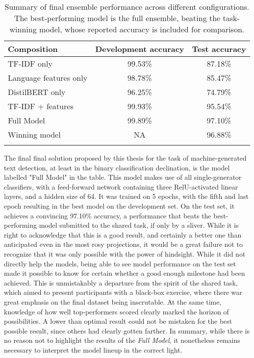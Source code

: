 \begin{table}[ht]
    \vspace{0.1cm}
    \centering
    \begin{tabular}{lcc}
        \toprule
        Composition            & Development accuracy & Test accuracy \\

        \midrule
        TF-IDF only            & 99.53\%              & 87.18\%       \\
        Language features only & 98.78\%              & 85.47\%       \\
        DistilBERT only        & 96.25\%              & 74.79\%       \\
        TF-IDF + features      & 99.93\%              & 95.54\%       \\
        \midrule
        Full Model             & 99.89\%              & 97.10\%       \\
        Winning model          & NA                   & 96.88\%       \\
        \bottomrule
        \vspace{0.1cm}
    \end{tabular}
    \caption{
        Summary of final ensemble performance across different configurations.
        The best-performing model is the full ensemble, beating the task-winning model, whose reported accuracy is included for comparison.
    }
    \label{tab:ensemble-final}
\end{table}

The final final solution proposed by this thesis for the task of machine-generated text detection, at least in the binary classification declination, is the model labelled "Full Model" in the table.
This model makes use of all single-generator classifiers, with a feed-forward network containing three RelU-activated linear layers, and a hidden size of 64.
It was trained on 5 epochs, with the fifth and last epoch resulting in the best model on the development set.
On the test set, it achieves a convincing 97.10\% accuracy, a performance that beats the best-performing model submitted to the shared task, if only by a sliver.
While it is right to acknowledge that this is a good result, and certainly a better one than anticipated even in the most rosy projections, it would be a great failure not to recognize that it was only possible with the power of hindsight.
While it did not directly help the models, being able to see model performance on the test set made it possible to know for certain whether a good enough milestone had been achieved.
This is unmistakably a departure from the spirit of the shared task, which aimed to present participants with a black-box exercise, where there war great emphasis on the final dataset being inscrutable.
At the same time, knowledge of how well top-performers scored clearly marked the horizon of possibilities.
A lower than optimal result could not be mistaken for the best possible result, since others had clearly gotten farther.
In summary, while there is no reason not to highlight the results of the \emph{Full Model}, it nonetheless remains necessary to interpret the model lineup in the correct light.

